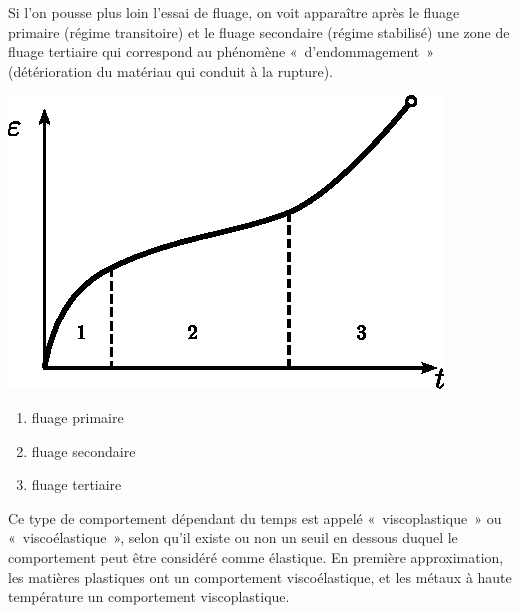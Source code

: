 Si l'on pousse plus loin l'essai de fluage, on voit apparaître après le fluage primaire (régime transitoire) et le fluage secondaire (régime stabilisé) une zone de fluage tertiaire qui correspond au phénomène «~d'endommagement~» (détérioration du matériau qui conduit à la rupture).
\begin{multicols}{2}
    \begin{center}
        \includegraphics{../images/T1_Ch04-0021}
    \end{center}
    \columnbreak
    \begin{enumerate}
        \item fluage primaire
        \item fluage secondaire
        \item fluage tertiaire
    \end{enumerate}
\end{multicols}

Ce type de comportement dépendant du temps est appelé «~viscoplastique~»  ou «~viscoélastique~», selon qu'il existe ou non un seuil en dessous duquel le comportement peut être considéré comme élastique.
En première approximation, les matières plastiques ont un comportement viscoélastique, et les métaux à haute température un comportement viscoplastique.

